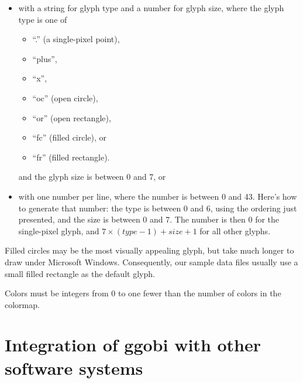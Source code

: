 \documentclass[11pt]{article}
\begin{document}
\begin{itemize}
\item with a string for glyph type and a number for glyph size, where the
glyph type is one of
  \begin {itemize}
  \itemsep 0em
  \item ``.'' (a single-pixel point),
  \item ``plus'',
  \item ``x'',
  \item ``oc'' (open circle),
  \item ``or'' (open rectangle),
  \item ``fc'' (filled circle), or
  \item ``fr'' (filled rectangle).
  \end {itemize}
and the glyph size is between 0 and 7, or

\item with one number per line, where the number is between 0 and
43.  Here's how to generate that number: the type is between 0 and 6,
using the ordering just presented, and the size is between 0 and 7.
The number is then 0 for the single-pixel glyph, and
$7 \times (type-1) + size + 1$ for all other glyphs.
\end{itemize}

Filled circles may be the most visually appealing glyph, but take much
longer to draw under Microsoft Windows.  Consequently, our sample data
files usually use a small filled rectangle as the default glyph.

Colors must be integers from 0 to one fewer than the number of colors in
the colormap.

\section{Integration of ggobi with other software systems}
\label{slbl:Integration}
\end{document}
